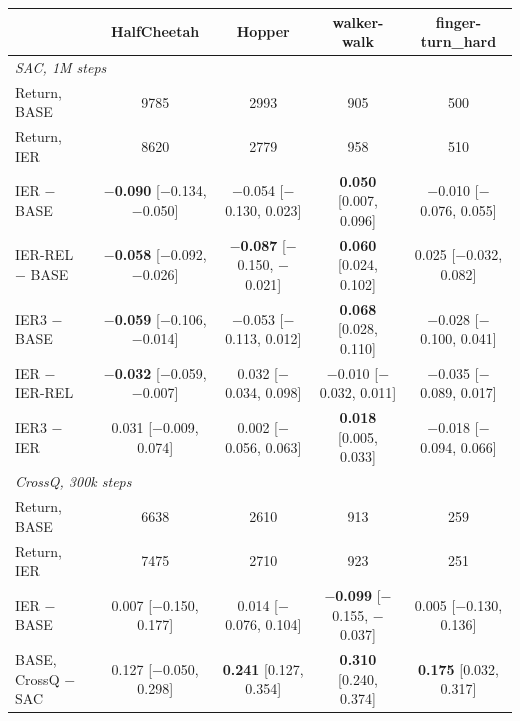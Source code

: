 \setlength{\tabcolsep}{2pt}
\begin{tabular}{lcccc}
\toprule
 & HalfCheetah & Hopper & walker-walk & finger-turn\_hard \\
\midrule
\multicolumn{5}{l}{\textit{SAC, 1M steps}} \\
Return, BASE & 9785 & 2993 & 905 & 500 \\
Return, IER & 8620 & 2779 & 958 & 510 \\
\addlinespace[2pt]
IER $-$ BASE & \textbf{$-$0.090} {\footnotesize[$-$0.134, $-$0.050]} & $-$0.054 {\footnotesize[$-$0.130, 0.023]} & \textbf{0.050} {\footnotesize[0.007, 0.096]} & $-$0.010 {\footnotesize[$-$0.076, 0.055]} \\
IER-REL $-$ BASE & \textbf{$-$0.058} {\footnotesize[$-$0.092, $-$0.026]} & \textbf{$-$0.087} {\footnotesize[$-$0.150, $-$0.021]} & \textbf{0.060} {\footnotesize[0.024, 0.102]} & 0.025 {\footnotesize[$-$0.032, 0.082]} \\
IER3 $-$ BASE & \textbf{$-$0.059} {\footnotesize[$-$0.106, $-$0.014]} & $-$0.053 {\footnotesize[$-$0.113, 0.012]} & \textbf{0.068} {\footnotesize[0.028, 0.110]} & $-$0.028 {\footnotesize[$-$0.100, 0.041]} \\
IER $-$ IER-REL & \textbf{$-$0.032} {\footnotesize[$-$0.059, $-$0.007]} & 0.032 {\footnotesize[$-$0.034, 0.098]} & $-$0.010 {\footnotesize[$-$0.032, 0.011]} & $-$0.035 {\footnotesize[$-$0.089, 0.017]} \\
IER3 $-$ IER & 0.031 {\footnotesize[$-$0.009, 0.074]} & 0.002 {\footnotesize[$-$0.056, 0.063]} & \textbf{0.018} {\footnotesize[0.005, 0.033]} & $-$0.018 {\footnotesize[$-$0.094, 0.066]} \\
\midrule
\multicolumn{5}{l}{\textit{CrossQ, 300k steps}} \\
Return, BASE & 6638 & 2610 & 913 & 259 \\
Return, IER & 7475 & 2710 & 923 & 251 \\
\addlinespace[2pt]
IER $-$ BASE & 0.007 {\footnotesize[$-$0.150, 0.177]} & 0.014 {\footnotesize[$-$0.076, 0.104]} & \textbf{$-$0.099} {\footnotesize[$-$0.155, $-$0.037]} & 0.005 {\footnotesize[$-$0.130, 0.136]} \\
BASE, CrossQ $-$ SAC & 0.127 {\footnotesize[$-$0.050, 0.298]} & \textbf{0.241} {\footnotesize[0.127, 0.354]} & \textbf{0.310} {\footnotesize[0.240, 0.374]} & \textbf{0.175} {\footnotesize[0.032, 0.317]} \\
\bottomrule
\end{tabular}
